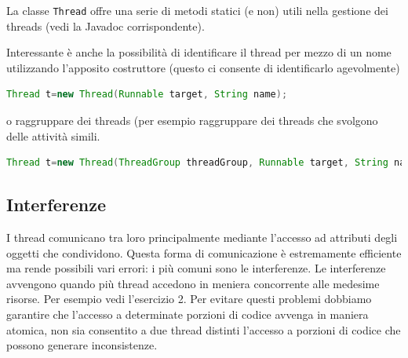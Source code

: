 \documentclass{article}
\begin{document}
La classe \texttt{Thread} offre una serie di metodi statici (e non) utili nella gestione dei threads (vedi la Javadoc corrispondente).

Interessante \`e anche la possibilit\`a di identificare il thread per mezzo di un nome utilizzando l'apposito costruttore (questo ci consente di identificarlo agevolmente)
\begin{lstlisting}[language=Java]
Thread t=new Thread(Runnable target, String name);
\end{lstlisting}

 o raggruppare dei threads (per esempio raggruppare dei threads che svolgono delle attivit\`a simili.
 \begin{lstlisting}[language=Java]
Thread t=new Thread(ThreadGroup threadGroup, Runnable target, String name);
\end{lstlisting}





\subsection{Interferenze}
I thread comunicano tra loro principalmente mediante l'accesso ad attributi degli oggetti che condividono. Questa forma di comunicazione \`e estremamente efficiente ma rende possibili vari errori: i pi\`u comuni sono le interferenze. Le interferenze avvengono quando pi\`u thread accedono in meniera concorrente alle medesime risorse. Per esempio vedi l'esercizio 2. Per evitare questi problemi dobbiamo garantire che l'accesso a determinate porzioni di codice avvenga in maniera atomica, non sia consentito a due thread distinti l'accesso a porzioni di codice che possono generare inconsistenze.
\end{document}
